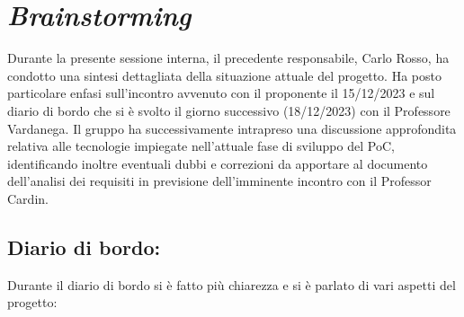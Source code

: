 \section{\textit{Brainstorming}}

Durante la presente sessione interna, il precedente responsabile, Carlo Rosso, ha condotto
una sintesi dettagliata della situazione attuale del progetto. Ha posto particolare enfasi
sull'incontro avvenuto con il proponente il 15/12/2023 e sul diario di bordo che si è svolto il
giorno successivo (18/12/2023) con il Professore Vardanega. Il gruppo ha successivamente intrapreso
una discussione approfondita relativa alle tecnologie impiegate nell'attuale fase di sviluppo del PoC,
identificando inoltre eventuali dubbi e correzioni da apportare al documento dell'analisi
dei requisiti in previsione dell'imminente incontro con il Professor Cardin.
\\

\subsection*{Diario di bordo:}
Durante il diario di bordo si è fatto più chiarezza e si è parlato di vari aspetti del progetto:

